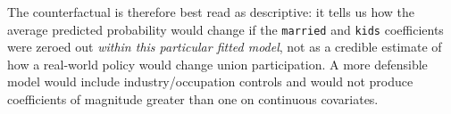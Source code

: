 \documentclass[12pt,english]{article}
\begin{document}
The counterfactual is therefore best read as descriptive: it tells us
how the average predicted probability would change if the
\texttt{married} and \texttt{kids} coefficients were zeroed out
\emph{within this particular fitted model}, not as a credible estimate
of how a real-world policy would change union participation. A more
defensible model would include industry/occupation controls and would
not produce coefficients of magnitude greater than one on continuous
covariates.
\end{document}
